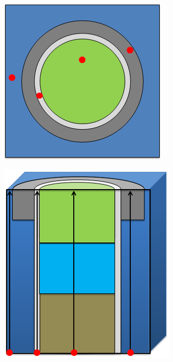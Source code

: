 \begin{figure}[h!]
	\centering
	\begin{subfigure}[b]{0.25\textwidth}
		\centering
		\includegraphics[width=\linewidth]{figures/ph2016/fsr-init-a.PNG}
		\caption{}
		\label{fig:fsr-init-a}
	\end{subfigure}
	\begin{subfigure}[b]{0.28\textwidth}
		\centering
		\includegraphics[width=\linewidth]{figures/ph2016/fsr-init-b.PNG}

\end{subfigure}
\end{figure}
